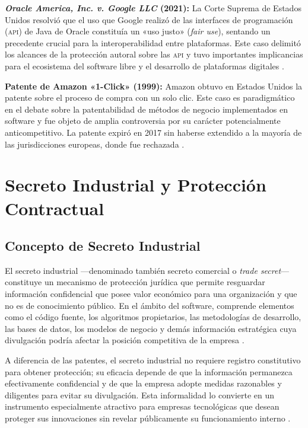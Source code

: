 \documentclass[11pt,a4paper]{report}
\begin{document}
\textbf{\textit{Oracle America, Inc. v. Google LLC} (2021):} La Corte Suprema de Estados Unidos resolvió que el uso que Google realizó de las interfaces de programación (\textsc{api}) de Java de Oracle constituía un «uso justo» (\textit{fair use}), sentando un precedente crucial para la interoperabilidad entre plataformas. Este caso delimitó los alcances de la protección autoral sobre las \textsc{api} y tuvo importantes implicancias para el ecosistema del software libre y el desarrollo de plataformas digitales \citep{euipo2022}.

\textbf{Patente de Amazon «1-Click» (1999):} Amazon obtuvo en Estados Unidos la patente sobre el proceso de compra con un solo clic. Este caso es paradigmático en el debate sobre la patentabilidad de métodos de negocio implementados en software y fue objeto de amplia controversia por su carácter potencialmente anticompetitivo. La patente expiró en 2017 sin haberse extendido a la mayoría de las jurisdicciones europeas, donde fue rechazada \citep{euipo2022}.

\newpage

\chapter{Secreto Industrial y Protección Contractual}

\section{Concepto de Secreto Industrial}

El secreto industrial —denominado también secreto comercial o \textit{trade secret}— constituye un mecanismo de protección jurídica que permite resguardar información confidencial que posee valor económico para una organización y que no es de conocimiento público. En el ámbito del software, comprende elementos como el código fuente, los algoritmos propietarios, las metodologías de desarrollo, las bases de datos, los modelos de negocio y demás información estratégica cuya divulgación podría afectar la posición competitiva de la empresa \citep{ompi2024}.

A diferencia de las patentes, el secreto industrial no requiere registro constitutivo para obtener protección; su eficacia depende de que la información permanezca efectivamente confidencial y de que la empresa adopte medidas razonables y diligentes para evitar su divulgación. Esta informalidad lo convierte en un instrumento especialmente atractivo para empresas tecnológicas que desean proteger sus innovaciones sin revelar públicamente su funcionamiento interno \citep{indecopi2023}.
\end{document}
